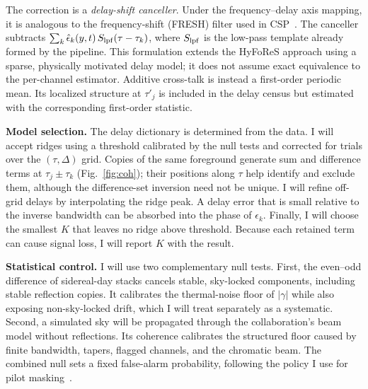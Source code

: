 \documentclass[12pt]{article}
\begin{document}
The correction is a \emph{delay-shift canceller}. Under the frequency--delay axis mapping, it is analogous to the frequency-shift (FRESH) filter used in CSP~\cite[Sec.~3.6; Eqs.~(3.71)--(3.72), p.~650; Sec.~7.2, Eqs.~(7.1), (7.6)--(7.9), pp.~661--662]{gardner2006}. The canceller subtracts $\sum_k\hat\epsilon_k(y,t)\,S_{\rm lpf}(\tau-\tau_k)$, where $S_{\rm lpf}$ is the low-pass template already formed by the pipeline. This formulation extends the HyFoReS approach using a sparse, physically motivated delay model; it does not assume exact equivalence to the per-channel estimator. Additive cross-talk is instead a first-order periodic mean. Its localized structure at $\tau'_j$ is included in the delay census but estimated with the corresponding first-order statistic.

\textbf{Model selection.} The delay dictionary is determined from the data. I will accept ridges using a threshold calibrated by the null tests and corrected for trials over the $(\tau,\Delta)$ grid. Copies of the same foreground generate sum and difference terms at $\tau_j\pm\tau_k$ (Fig.~\ref{fig:coh}); their positions along $\tau$ help identify and exclude them, although the difference-set inversion need not be unique. I will refine off-grid delays by interpolating the ridge peak. A delay error that is small relative to the inverse bandwidth can be absorbed into the phase of $\epsilon_k$. Finally, I will choose the smallest $K$ that leaves no ridge above threshold. Because each retained term can cause signal loss, I will report $K$ with the result.

\textbf{Statistical control.} I will use two complementary null tests. First, the even--odd difference of sidereal-day stacks cancels stable, sky-locked components, including stable reflection copies. It calibrates the thermal-noise floor of $|\gamma|$ while also exposing non-sky-locked drift, which I will treat separately as a systematic. Second, a simulated sky will be propagated through the collaboration's beam model without reflections. Its coherence calibrates the structured floor caused by finite bandwidth, tapers, flagged channels, and the chromatic beam. The combined null sets a fixed false-alarm probability, following the policy I use for pilot masking~\cite{gormley2026a}.
\end{document}
